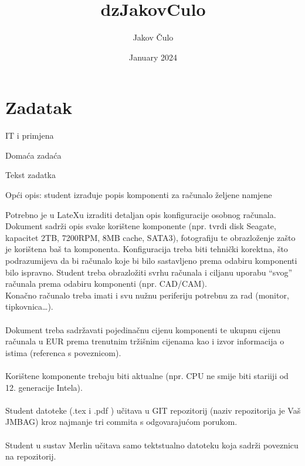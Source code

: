 \documentclass{article}
\title{dzJakovCulo}
\author{Jakov Čulo}
\date{January 2024}
\begin{document}
\maketitle
\newpage
\tableofcontents
\newpage
\listoffigures
\newpage
\section{Zadatak}
IT i primjena\\
\begin{center}Domaća zadaća\end{center} 
\begin{center}Tekst zadatka\end{center} 
\begin{flushleft}Opći opis: student izrađuje popis komponenti za računalo željene namjene\end{flushleft} Potrebno je u LateXu izraditi detaljan opis konfiguracije osobnog računala. Dokument sadrži opis svake korištene komponente (npr. tvrdi disk Seagate, kapacitet 2TB, 7200RPM, 8MB cache, SATA3), fotografiju te obrazloženje zašto je korištena baš ta komponenta. Konfiguracija treba biti tehnički korektna, što podrazumijeva da bi računalo koje bi bilo sastavljeno prema odabiru komponenti bilo ispravno. Student treba obrazložiti svrhu računala i ciljanu uporabu “svog” računala prema odabiru komponenti (npr. CAD/CAM).\\ Konačno računalo treba imati i svu nužnu periferiju potrebnu za rad (monitor, tipkovnica…).\\\\ Dokument treba sadržavati pojedinačnu cijenu komponenti te ukupnu cijenu računala u EUR prema trenutnim tržišnim cijenama kao i izvor informacija o istima (referenca s poveznicom).\\\\ Korištene komponente trebaju biti aktualne (npr. CPU ne smije biti stariiji od 12. generacije Intela).\\\\ Student datoteke (.tex i .pdf ) učitava u GIT repozitorij (naziv repozitorija je Vaš JMBAG) kroz najmanje tri commita s odgovarajućom porukom.\\\\ Student u sustav Merlin učitava samo tektstualno datoteku koja sadrži poveznicu na repozitorij.
\newpage
\end{document}
